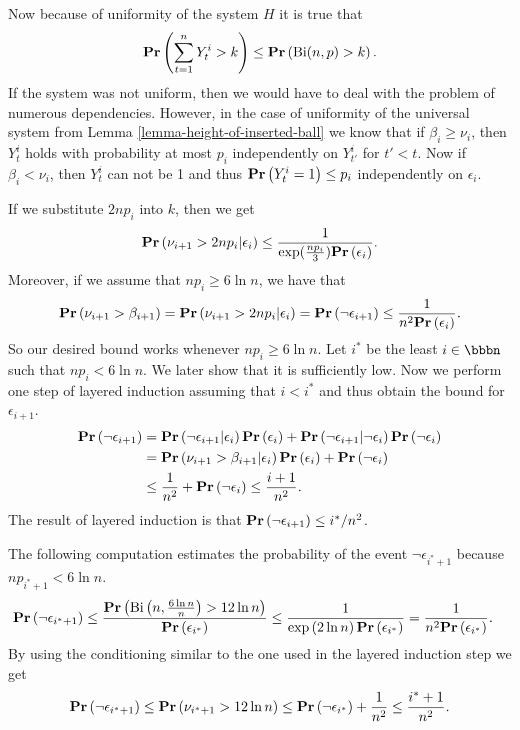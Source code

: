 Now because of uniformity of the system $H$ it is true that $$\mathbf{Pr}\left(\sum_{t = 1}^{n} Y_t^i > k\right) \leq \mathbf{Pr}\left(\mathrm{Bi}(n, p) > k\right).$$ If the system was not uniform, then we would have to deal with the problem of numerous dependencies. However, in the case of uniformity of the universal system from Lemma \ref{lemma-height-of-inserted-ball} we know that if $\beta_i \geq \nu_i$, then $Y_t^i$ holds with probability at most $p_i$ independently on $Y_{t'}^i$ for $t' < t$. Now if $\beta_i < \nu_i$, then $Y_t^i$ can not be 1 and thus $\mathbf{Pr}\left(Y_t^i = 1\right) \leq p_i$ independently on $\epsilon_i$.

If we substitute $2np_i$ into $k$, then we get
\[
\mathbf{Pr}\left(\nu_{i + 1} > 2np_i | \epsilon_i\right) \leq \frac{1}{\exp(\frac{np_i}{3})\mathbf{Pr}\left(\epsilon_i\right)}.
\]
Moreover, if we assume that $np_i \geq 6 \ln n$, we have that 
\[
\mathbf{Pr}\left(\nu_{i + 1} > \beta_{i + 1}\right) = \mathbf{Pr}\left(\nu_{i + 1} > 2np_i | \epsilon_i\right) = \mathbf{Pr}\left(\neg \epsilon_{i + 1}\right) \leq \frac{1}{n ^ 2\mathbf{Pr}\left(\epsilon_i\right)} \textit{.}
\]
So our desired bound works whenever $np_i \geq 6 \ln n$. Let $i^*$ be the least $i \in \bbbn$ such that $np_i < 6 \ln n$. We later show that it is sufficiently low. Now we perform one step of layered induction assuming that $i<i^*$ and thus obtain the bound for $\epsilon_{i + 1}$.
\[
\begin{split}
\mathbf{Pr}\left(\neg \epsilon_{i + 1}\right) 
	& = \mathbf{Pr}\left(\neg \epsilon_{i + 1} | \epsilon_i\right)\mathbf{Pr}\left(\epsilon_i\right) + \mathbf{Pr}\left(\neg \epsilon_{i + 1} | \neg \epsilon_i\right)\mathbf{Pr}\left(\neg \epsilon_i\right) \\
	& = \mathbf{Pr}\left(\nu_{i + 1} > \beta_{i + 1} | \epsilon_i\right)\mathbf{Pr}\left(\epsilon_i\right) + \mathbf{Pr}\left(\neg \epsilon_i\right) \\
	& \leq \frac{1}{n ^ 2} + \mathbf{Pr}\left(\neg \epsilon_i\right) \leq \frac{i + 1}{n ^ 2} \textit{.}
\end{split} 
\]
The result of layered induction is that $\mathbf{Pr}\left(\neg \epsilon_{i + 1}\right) \leq i^* / n^2$. 

The following computation estimates the probability of the event $\neg \epsilon_{i^* + 1}$ because $np_{i^* + 1} < 6 \ln n$.
\[
\begin{split}
\mathbf{Pr}\left(\neg \epsilon_{i^* + 1}\right)
	\leq \frac{\mathbf{Pr}\left(\mathrm{Bi}\left(n, \frac{6 \ln n}{n}\right) > 12 \ln n\right)}{\mathbf{Pr}\left(\epsilon_{i^*}\right)} 
	& \leq \frac{1}{\exp\left(2 \ln n\right)\mathbf{Pr}\left(\epsilon_{i^*}\right)} = \frac{1}{n ^ 2 \mathbf{Pr}\left(\epsilon_{i^*}\right)} \textit{.}
\end{split}
\]
By using the conditioning similar to the one used in the layered induction step we get
\[
\mathbf{Pr}\left(\neg \epsilon_{i^* + 1}\right) \leq \mathbf{Pr}\left(\nu_{i^* + 1} > 12 \ln n\right) \leq \mathbf{Pr}\left(\neg \epsilon_{i^*}\right) + \frac{1}{n ^ 2} \leq \frac{i^* + 1}{n ^ 2} \textit{.}
\]

